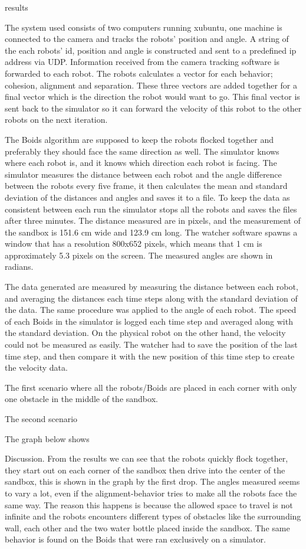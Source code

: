 results

The system used consists of two computers running xubuntu, one machine is connected to the camera and tracks the robots' position and angle. A string of the each robots' id, position and angle is constructed and sent to a predefined ip address via UDP. Information received from the camera tracking software is forwarded to each robot. The robots calculates a vector for each behavior; cohesion, alignment and separation. These three vectors are added together for a final vector which is the direction the robot would want to go. This final vector is sent back to the simulator so it can forward the velocity of this robot to the other robots on the next iteration.

The Boids algorithm are supposed to keep the robots flocked together and preferably they should face the same direction as well. The simulator knows where each robot is, and it knows which direction each robot is facing. The simulator measures the distance between each robot and the angle difference between the robots every five frame, it then calculates the mean and standard deviation of the distances and angles and saves it to a file.
To keep the data as consistent between each run the simulator stops all the robots and saves the files after three minutes.
The distance measured are in pixels, and the measurement of the sandbox is 151.6 cm wide and 123.9 cm long. The watcher software spawns a window that has a resolution 800x652 pixels, which means that 1 cm is approximately 5.3 pixels on the screen. The measured angles are shown in radians.

The data generated are measured by measuring the distance between each robot, and averaging the distances each time steps along with the standard deviation of the data. The same procedure was applied to the angle of each robot.
The speed of each Boids in the simulator is logged each time step and averaged along with the standard deviation. On the physical robot on the other hand, the velocity could not be measured as easily. The watcher had to save the position of the last time step, and then compare it with the new position of this time step to create the velocity data.

The first scenario where all the robots/Boids are placed in each corner with only one obstacle in the middle of the sandbox. 

The second scenario

The graph below shows





Discussion.
From the results we can see that the robots quickly flock together, they start out on each corner of the sandbox then drive into the center of the sandbox, this is shown in the graph by the first drop. 
The angles measured seems to vary a lot, even if the alignment-behavior tries to make all the robots face the same way. The reason this happens is because the allowed space to travel is not infinite and the robots encounters different types of obstacles like the surrounding wall, each other and the two water bottle placed inside the sandbox. The same behavior is found on the Boids that were ran exclusively on a simulator.